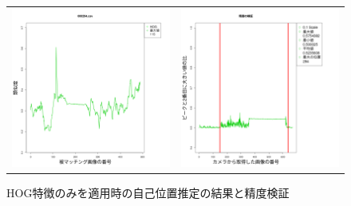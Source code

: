 \documentclass[titlepage,dvipdfmx]{jsarticle}
\begin{document}
\begin{figure}[H]
  \centering
  \begin{tabular}{cc}
    \begin{minipage}[b]{0.5\linewidth}
      \centering
      \includegraphics[pagebox=cropbox, scale=0.25]{sotuken_png/resutlHOG_000294.png}
    \end{minipage}
    &
    \begin{minipage}[b]{0.5\linewidth}
      \centering
      \includegraphics[pagebox=cropbox, scale=0.25]{sotuken_png/peak/peak_HOG.png}
    \end{minipage}
  \end{tabular}
  \caption{HOG特徴のみを適用時の自己位置推定の結果と精度検証}
  \label{HOGR}
\end{figure}
\end{document}
